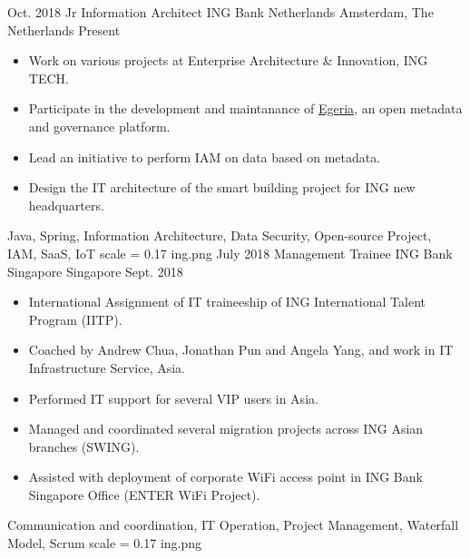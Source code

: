 %
%
%
%
%

\begin{experiences}
	\experience
	{Oct. 2018} {Jr Information Architect} {ING Bank Netherlands} {Amsterdam, The Netherlands}
	{Present}{
		\begin{itemize}
			\item Work on various projects at Enterprise Architecture \& Innovation, ING TECH.
			\item Participate in the development and maintanance of \href{https://github.com/odpi/egeria}{Egeria}, an open metadata and governance platform. 
			\item Lead an initiative to perform IAM on data based on metadata.  
			\item Design the IT architecture of the smart building project for ING new headquarters.
    \end{itemize}}
	{Java, Spring, Information Architecture, Data Security, Open-source Project, IAM, SaaS, IoT}
	{scale = 0.17}		{ing.png}
	\experience
	{July 2018} {Management Trainee} {ING Bank Singapore} {Singapore}
	{Sept. 2018}{
		\begin{itemize}
			\item International Assignment of IT traineeship of ING International Talent Program (IITP).
			\item Coached by Andrew Chua, Jonathan Pun and Angela Yang, and work in IT Infrastructure Service, Asia.
			\item Performed IT support for several VIP users in Asia.
			\item Managed and coordinated several migration projects across ING Asian branches (SWING).
			\item Assisted with deployment of corporate WiFi access point in ING Bank Singapore Office (ENTER WiFi Project).  
	\end{itemize}}
	{Communication and coordination, IT Operation, Project Management, Waterfall Model, Scrum}
	{scale = 0.17}		{ing.png} 
	

\end{experiences}

